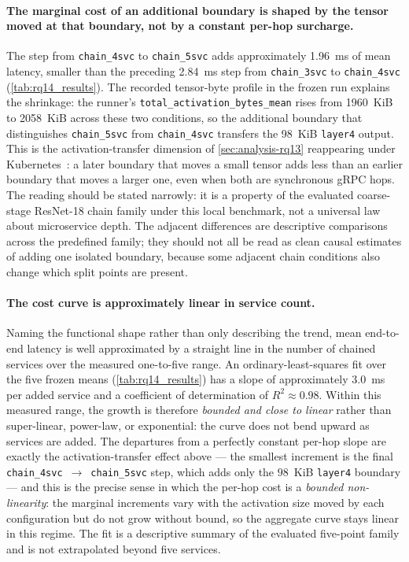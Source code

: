 \paragraph{The marginal cost of an additional boundary is shaped by the tensor moved at that boundary, not by a constant per-hop surcharge.}
The step from \texttt{chain\_4svc} to \texttt{chain\_5svc} adds
approximately 1.96~ms of mean latency, smaller than the preceding
2.84~ms step from \texttt{chain\_3svc} to \texttt{chain\_4svc}
(\cref{tab:rq14_results}). The recorded tensor-byte profile in the
frozen run explains the shrinkage: the runner's
\texttt{total\_activation\_bytes\_mean} rises from 1960~KiB to
2058~KiB across these two conditions, so the additional boundary that
distinguishes \texttt{chain\_5svc} from \texttt{chain\_4svc} transfers
the 98~KiB \texttt{layer4} output. This is the activation-transfer
dimension of \cref{sec:analysis-rq13} reappearing under
Kubernetes~\cite{deeperthings}: a later boundary that moves a small
tensor adds less than an earlier boundary that moves a larger one,
even when both are synchronous gRPC hops. The reading should be
stated narrowly: it is a property of the evaluated coarse-stage
ResNet-18 chain family under this local benchmark, not a universal
law about microservice depth.
The adjacent differences are descriptive comparisons across the predefined
family; they should not all be read as clean causal estimates of adding one
isolated boundary, because some adjacent chain conditions also change which
split points are present.

\paragraph{The cost curve is approximately linear in service count.}
Naming the functional shape rather than only describing the trend, mean
end-to-end latency is well approximated by a straight line in the number of
chained services over the measured one-to-five range. An ordinary-least-squares
fit over the five frozen means (\cref{tab:rq14_results}) has a slope of
approximately $3.0$~ms per added service and a coefficient of determination of
$R^{2}\approx0.98$. Within this measured range, the growth is therefore
\emph{bounded and close to linear} rather than super-linear, power-law, or
exponential: the curve does not bend upward as services are added. The departures from a perfectly constant per-hop
slope are exactly the activation-transfer effect above --- the smallest increment
is the final \texttt{chain\_4svc}~$\rightarrow$~\texttt{chain\_5svc} step, which
adds only the $98$~KiB \texttt{layer4} boundary --- and this is the precise sense
in which the per-hop cost is a \emph{bounded non-linearity}: the marginal
increments vary with the activation size moved by each configuration but do not
grow without bound, so the aggregate curve stays linear in this regime. The fit
is a descriptive summary of the evaluated five-point family and is not
extrapolated beyond five services.

